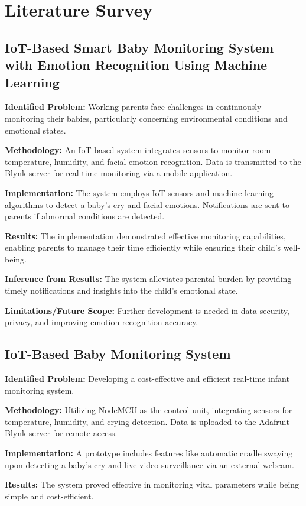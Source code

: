 \documentclass[conference]{IEEEtran}
\begin{document}
\section{Literature Survey}

\subsection{IoT-Based Smart Baby Monitoring System with Emotion Recognition Using Machine Learning}
\textbf{Identified Problem:} Working parents face challenges in continuously monitoring their babies, particularly concerning environmental conditions and emotional states.

\textbf{Methodology:} An IoT-based system integrates sensors to monitor room temperature, humidity, and facial emotion recognition. Data is transmitted to the Blynk server for real-time monitoring via a mobile application.

\textbf{Implementation:} The system employs IoT sensors and machine learning algorithms to detect a baby’s cry and facial emotions. Notifications are sent to parents if abnormal conditions are detected.

\textbf{Results:} The implementation demonstrated effective monitoring capabilities, enabling parents to manage their time efficiently while ensuring their child’s well-being.

\textbf{Inference from Results:} The system alleviates parental burden by providing timely notifications and insights into the child’s emotional state.

\textbf{Limitations/Future Scope:} Further development is needed in data security, privacy, and improving emotion recognition accuracy.

\subsection{IoT-Based Baby Monitoring System}
\textbf{Identified Problem:} Developing a cost-effective and efficient real-time infant monitoring system.

\textbf{Methodology:} Utilizing NodeMCU as the control unit, integrating sensors for temperature, humidity, and crying detection. Data is uploaded to the Adafruit Blynk server for remote access.

\textbf{Implementation:} A prototype includes features like automatic cradle swaying upon detecting a baby’s cry and live video surveillance via an external webcam.

\textbf{Results:} The system proved effective in monitoring vital parameters while being simple and cost-efficient.
\end{document}
